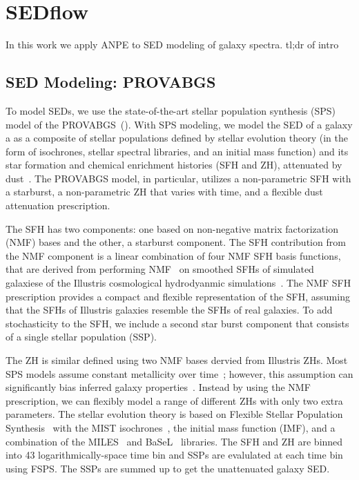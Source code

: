 \section{SEDflow} \label{sec:sedflow}
In this work we apply ANPE to SED modeling of galaxy spectra. 
tl;dr of intro 

\subsection{SED Modeling: PROVABGS} \label{sec:provabgs}
To model SEDs, we use the state-of-the-art stellar population synthesis (SPS)
model of the PROVABGS~(). 
With SPS modeling, we model the SED of a galaxy a as a composite of stellar
populations defined by stellar evolution theory (in the form of isochrones,
stellar spectral libraries, and an initial mass function) and its star
formation and chemical enrichment histories (SFH and ZH), attenuated by
dust~\citep[see][for a review]{conroy2013}. 
The PROVABGS model, in particular, utilizes a non-parametric SFH with a
starburst, a non-parametric ZH that varies with time, and a flexible dust
attenuation prescription.

The SFH has two components: one based on non-negative matrix factorization
(NMF) bases and the other, a starburst component.
The SFH contribution from the NMF component is a linear combination of four NMF
SFH basis functions, that are derived from performing NMF~\citep{lee1999,
cichocki2009, fevotte2011}
on smoothed SFHs of simulated galaxiese of the Illustris cosmological
hydrodyanmic simulations~\citep{vogelsberger2014, genel2014, nelson2015}.
The NMF SFH prescription provides a compact and flexible representation of the
SFH, assuming that the SFHs of Illustris galaxies resemble the SFHs of real
galaxies. 
To add stochasticity to the SFH, we include a second star burst component that
consists of a single stellar population (SSP). 

The ZH is similar defined using two NMF bases dervied from Illustris ZHs. 
Most SPS models assume constant metallicity over
time~\citep[\emph{e.g.}][]{carnall2017, leja2019}; however, this assumption can
significantly bias inferred galaxy properties~\citep{thorne2021}. 
Instead by using the NMF prescription, we can flexibly model a range of
different ZHs with only two extra parameters.  
The stellar evolution theory is based on Flexible Stellar Population
Synthesis~\citep[FSPS;][]{conroy2009, conroy2010c} with the MIST
isochrones~\citep{paxton2011, paxton2013, paxton2015, choi2016, dotter2016},  
the \cite{chabrier2003} initial mass function (IMF), and a combination of the
MILES~\citep{sanchez-blazquez2006} and BaSeL~\citep{lejeune1997, lejeune1998,
westera2002} libraries.
The SFH and ZH are binned into 43 logarithmically-space time bin and SSPs are
evalulated at each time bin using FSPS. 
The SSPs are summed up to get the unattenuated galaxy SED. 

